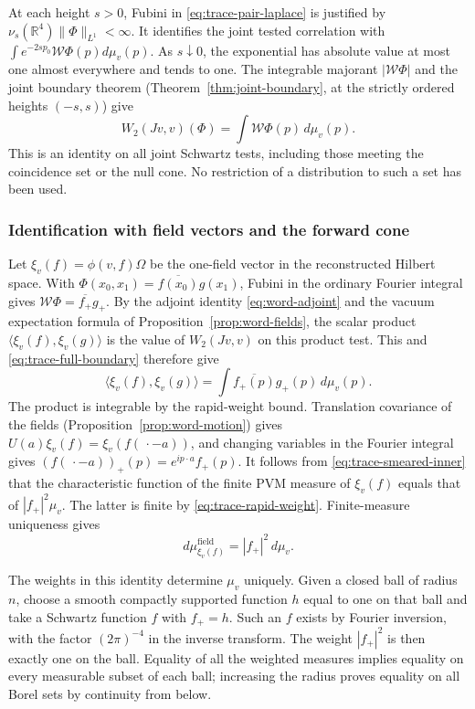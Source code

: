 At each height $s>0$, Fubini in \eqref{eq:trace-pair-laplace} is justified
by $\nu_s(\mathbb R^4)\|\Phi\|_{L^1}<\infty$. It identifies the joint
tested correlation with
$\int e^{-2sp_0}\mathcal W\Phi(p)d\mu_v(p)$.
As $s\downarrow0$, the exponential has absolute value at most one
almost everywhere and tends to one. The integrable majorant
$|\mathcal W\Phi|$ and the joint boundary theorem
(Theorem~\ref{thm:joint-boundary}, at the strictly ordered heights
$(-s,s)$) give
\begin{equation}\label{eq:trace-full-boundary}
 W_2(Jv,v)(\Phi)=\int\mathcal W\Phi(p)\,d\mu_v(p).
\end{equation}
This is an identity on all joint Schwartz tests, including those meeting
the coincidence set or the null cone. No restriction of a distribution
to such a set has been used.

\subsubsection{Identification with field vectors and the forward cone}
Let $\xi_v(f)=\phi(v,f)\Omega$ be the one-field vector in the reconstructed
Hilbert space. With
$\Phi(x_0,x_1)=\overline{f(x_0)}g(x_1)$, Fubini in the ordinary Fourier
integral gives
$\mathcal W\Phi=\overline{f_+}g_+$. By the adjoint identity
\eqref{eq:word-adjoint} and the vacuum expectation formula of
Proposition~\ref{prop:word-fields}, the scalar product
$\langle\xi_v(f),\xi_v(g)\rangle$ is the value of $W_2(Jv,v)$ on this
product test. This and
\eqref{eq:trace-full-boundary} therefore give
\begin{equation}\label{eq:trace-smeared-inner}
 \langle\xi_v(f),\xi_v(g)\rangle
                  =\int\overline{f_+(p)}g_+(p)\,d\mu_v(p).
\end{equation}
The product is integrable by the rapid-weight bound.
Translation covariance of the fields
(Proposition~\ref{prop:word-motion}) gives
$U(a)\xi_v(f)=\xi_v(f(\,\cdot-a))$, and changing variables in the
Fourier integral gives
$(f(\,\cdot-a))_+(p)=e^{ip\cdot a}f_+(p)$.
It follows from \eqref{eq:trace-smeared-inner} that the characteristic
function of the finite PVM measure of $\xi_v(f)$ equals that of
$|f_+|^2\mu_v$. The latter is finite by
\eqref{eq:trace-rapid-weight}. Finite-measure uniqueness gives
\begin{equation}\label{eq:trace-field-mass}
 d\mu^{\mathrm{field}}_{\xi_v(f)}=|f_+|^2\,d\mu_v.
\end{equation}

The weights in this identity determine $\mu_v$ uniquely. Given a closed
ball of radius $n$, choose a smooth compactly supported function $h$ equal
to one on that ball and take a Schwartz function $f$ with $f_+=h$.
Such an $f$ exists by Fourier inversion, with the factor $(2\pi)^{-4}$
in the inverse transform. The weight $|f_+|^2$ is then exactly one on the
ball. Equality of all the weighted measures implies equality on every
measurable subset of each ball; increasing the radius proves equality
on all Borel sets by continuity from below.

